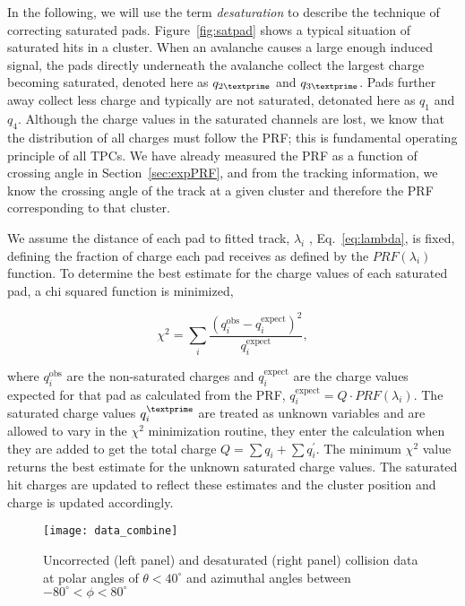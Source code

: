 In the following, we will use the term \emph{desaturation} to describe the technique of correcting saturated pads. Figure~\ref{fig:satpad} shows a typical situation of saturated hits in a cluster. When an avalanche causes a large enough induced signal, the pads directly underneath the avalanche collect the largest charge becoming saturated, denoted here as $q_{2\textprime}$ and $q_{3\textprime}$. Pads further away collect less charge and typically are not saturated, detonated here as $q_{1}$ and $q_{4}$. Although the charge values in the saturated channels are lost, we know that the distribution of all charges must follow the PRF; this is fundamental operating principle of all TPCs. We have already measured the PRF as a function of crossing angle in Section~\ref{sec:expPRF}, and from the tracking information, we know the crossing angle of the track at a given cluster and therefore the PRF corresponding to that cluster. 

We assume the distance of each pad to fitted track, $\lambda_i$ , Eq.~\ref{eq:lambda}, is fixed, defining the fraction of charge each pad receives as defined by the $PRF(\lambda_i)$ function. To determine the best estimate for the charge values of each saturated pad, a chi squared function is minimized,

\begin{equation}\label{eq:chi}
\chi^2 = \sum_i \frac{(q_i^{\mathrm{obs}} - q_i^{\mathrm{expect}})^2}{q_i^{\mathrm{expect}}},
\end{equation}


where $q_i^{\mathrm{obs}}$ are the non-saturated charges and $q_i^{\mathrm{expect}}$ are the charge values expected for that pad as calculated from the PRF, $q_i^{\mathrm{expect}} = Q\cdot PRF(\lambda_i)$. The saturated charge values $q_{i}^{\textprime}$ are treated as unknown variables and are allowed to vary in the $\chi^2$ minimization routine, they enter the calculation when they are added to get the total charge $Q = \sum q_i + \sum q_i^{'}$. The minimum $\chi^2$ value returns the best estimate for the unknown saturated charge values. The saturated hit charges are updated to reflect these estimates and the cluster position and charge is updated accordingly.


\begin{figure*}[!htb]
\centering
\texttt{[image: data\_combine]}
\caption{Uncorrected (left panel) and desaturated (right panel) collision data at polar angles of $\theta < 40^{\circ}$ and azimuthal angles between $-80^{\circ} < \phi < 80^{\circ}$}
\label{fig:data_combine}
\end{figure*}


